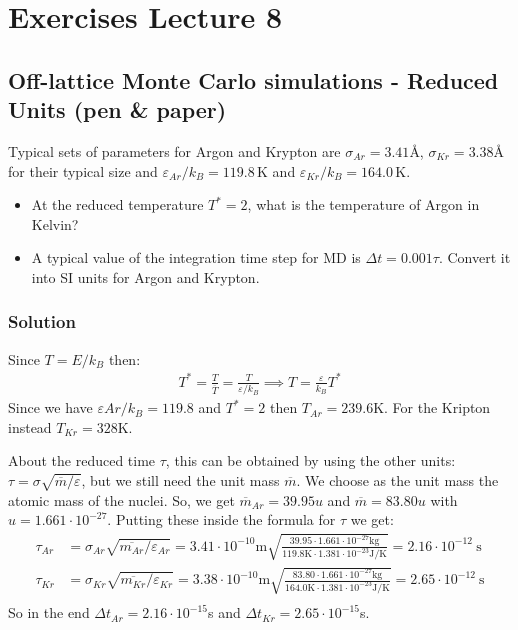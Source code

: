 \documentclass[../main.tex]{subfiles}
\begin{document}
\chapter{Exercises Lecture 8}


\section{Off-lattice Monte Carlo simulations - Reduced Units (pen \& paper)}
Typical sets of parameters for Argon and Krypton are $\sigma_{Ar} = 3.41$\r{A}, $\sigma_{Kr} = 3.38$\r{A} for their typical size and $\varepsilon_{Ar}/k_B = 119.8 \, \text{K}$ and $\varepsilon_{Kr}/k_B = 164.0 \, \text{K}$.

\begin{itemize}
    \item At the reduced temperature $T^* = 2$, what is the temperature of Argon in Kelvin?
    \item A typical value of the integration time step for MD is $\Delta t = 0.001 \tau$. Convert it into SI units for Argon and Krypton.
\end{itemize}
\subsection{Solution}

Since $T = E/k_B$ then:
\begin{align}
    T^* = \frac{T}{\overline{T}} = \frac{T}{\varepsilon/k_B} \implies T=\frac{\varepsilon}{k_B}T^*
\end{align}
Since we have $\varepsilon{Ar}/k_B = 119.8$ and $T^*=2$ then $T_{Ar} = 239.6$K. For the Kripton instead $T_{Kr} = 328$K.

About the reduced time $\tau$, this can be obtained by using the other units: $\tau=\sigma\sqrt{\overline{m}/\varepsilon}$, but we still need the unit mass $\overline{m}$. We choose as the unit mass the atomic mass of the nuclei. So, we get $\overline{m}_{Ar} = 39.95u$ and $\overline{m}=83.80u$ with $u=1.661\cdot 10^{-27}$. Putting these inside the formula for $\tau$ we get:
\begin{align}
    \tau_{Ar} &= \sigma_{Ar}\sqrt{\overline{m_{Ar}}/\varepsilon_{Ar}} = 3.41\cdot 10^{-10}\text{m}\sqrt{\frac{39.95\cdot 1.661\cdot 10^{-27}\text{kg}}{119.8\text{K} \cdot 1.381\cdot 10^{-23}\text{J/K}}} = 2.16\cdot10^{-12}\ \text{s}\\
    \tau_{Kr} &= \sigma_{Kr}\sqrt{\overline{m_{Kr}}/\varepsilon_{Kr}} = 3.38\cdot 10^{-10}\text{m}\sqrt{\frac{83.80\cdot 1.661\cdot 10^{-27}\text{kg}}{164.0\text{K} \cdot 1.381\cdot 10^{-23}\text{J/K}}} = 2.65\cdot10^{-12}\ \text{s}\\
\end{align}
So in the end $\Delta t_{Ar} = 2.16\cdot10^{-15}$s and $\Delta t_{Kr} = 2.65\cdot10^{-15}$s.
\end{document}
